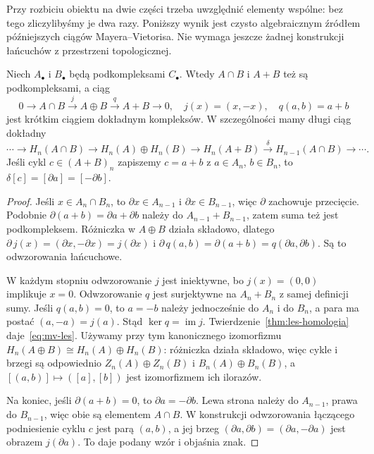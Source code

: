 Przy rozbiciu obiektu na dwie części trzeba
uwzględnić elementy wspólne: bez tego
zliczylibyśmy je dwa razy. Poniższy wynik
jest czysto algebraicznym źródłem
późniejszych ciągów Mayera--Vietorisa.
Nie wymaga jeszcze żadnej konstrukcji
łańcuchów z przestrzeni topologicznej.

\begin{twierdzenie}
\label{thm:mv-algebraiczny}
Niech $A_\bullet$ i $B_\bullet$ będą
podkompleksami $C_\bullet$. Wtedy
$A\cap B$ i $A+B$ też są podkompleksami,
a ciąg
\begin{equation}\label{eq:mv-ses}
 0\longrightarrow A\cap B
 \xrightarrow{\ j\ }A\oplus B
 \xrightarrow{\ q\ }A+B
 \longrightarrow0,
 \quad j(x)=(x,-x),\quad q(a,b)=a+b
\end{equation}
jest krótkim ciągiem dokładnym kompleksów.
W szczególności mamy długi ciąg dokładny
\begin{equation}\label{eq:mv-les}
 \cdots\to H_n(A\cap B)\to H_n(A)\oplus H_n(B)
 \to H_n(A+B)\xrightarrow{\delta}
 H_{n-1}(A\cap B)\to\cdots.
\end{equation}
Jeśli cykl $c\in(A+B)_n$ zapiszemy
$c=a+b$ z $a\in A_n$, $b\in B_n$,
to $\delta[c]=[\partial a]=[-\partial b]$.
\end{twierdzenie}
\begin{proof}
Jeśli $x\in A_n\cap B_n$, to
$\partial x\in A_{n-1}$ i $\partial x\in B_{n-1}$,
więc $\partial$ zachowuje przecięcie.
Podobnie $\partial(a+b)=\partial a+\partial b$ należy do
$A_{n-1}+B_{n-1}$, zatem suma
też jest podkompleksem.
Różniczka w $A\oplus B$ działa
składowo, dlatego
$\partial\,j(x)=(\partial x,-\partial x)=j(\partial x)$ i
$\partial\,q(a,b)=\partial(a+b)=q(\partial a,\partial b)$.
Są to odwzorowania łańcuchowe.

W każdym stopniu odwzorowanie $j$ jest
iniektywne, bo $j(x)=(0,0)$
implikuje $x=0$. Odwzorowanie $q$ jest
surjektywne na $A_n+B_n$ z samej
definicji sumy. Jeśli $q(a,b)=0$,
to $a=-b$ należy jednocześnie do
$A_n$ i do $B_n$, a para ma postać
$(a,-a)=j(a)$. Stąd
$\ker q=\operatorname{im}j$.
Twierdzenie~\ref{thm:les-homologia}
daje~\eqref{eq:mv-les}. Używamy przy tym kanonicznego izomorfizmu
$H_n(A\oplus B)\cong H_n(A)\oplus H_n(B)$:
różniczka działa składowo, więc cykle i brzegi są odpowiednio
$Z_n(A)\oplus Z_n(B)$ i $B_n(A)\oplus B_n(B)$,
a $[(a,b)]\mapsto([a],[b])$ jest izomorfizmem ich ilorazów.

Na koniec, jeśli $\partial(a+b)=0$, to
$\partial a=-\partial b$. Lewa strona należy do
$A_{n-1}$, prawa do $B_{n-1}$,
więc obie są elementem $A\cap B$.
W konstrukcji odwzorowania łączącego
podniesienie cyklu $c$ jest parą $(a,b)$,
a jej brzeg $(\partial a,\partial b)=(\partial a,-\partial a)$
jest obrazem $j(\partial a)$. To daje
podany wzór i objaśnia znak.
\end{proof}

